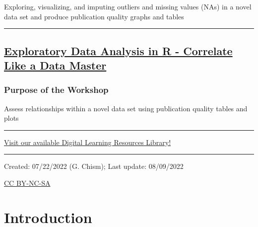 \documentclass[
  letterpaper,
  DIV=11,
  numbers=noendperiod]{scrreprt}
\begin{document}
Exploring, visualizing, and imputing outliers and missing values (NAs)
in a novel data set and produce publication quality graphs and tables

\begin{center}\rule{0.5\linewidth}{0.5pt}\end{center}

\hypertarget{exploratory-data-analysis-in-r---correlate-like-a-data-master}{%
\section*{\texorpdfstring{\href{https://github.com/Gchism94/Data7_EDA_In_R_Workshops/tree/main/Workshops/Fall2022/EDA_In_R_Fall5}{Exploratory
Data Analysis in R - Correlate Like a Data
Master}}{Exploratory Data Analysis in R - Correlate Like a Data Master}}\label{exploratory-data-analysis-in-r---correlate-like-a-data-master}}

\hypertarget{purpose-of-the-workshop-3}{%
\subsection*{Purpose of the Workshop}\label{purpose-of-the-workshop-3}}

Assess relationships within a novel data set using publication quality
tables and plots

\begin{center}\rule{0.5\linewidth}{0.5pt}\end{center}

\href{https://github.com/ua-data7/LearningResources/wiki}{Visit our
available Digital Learning Resources Library!}

\begin{center}\rule{0.5\linewidth}{0.5pt}\end{center}

Created: 07/22/2022 (G. Chism); Last update: 08/09/2022

\href{https://creativecommons.org/licenses/by-nc-sa/4.0/}{CC BY-NC-SA}


\hypertarget{introduction}{%
\chapter{Introduction}\label{introduction}}
\end{document}
